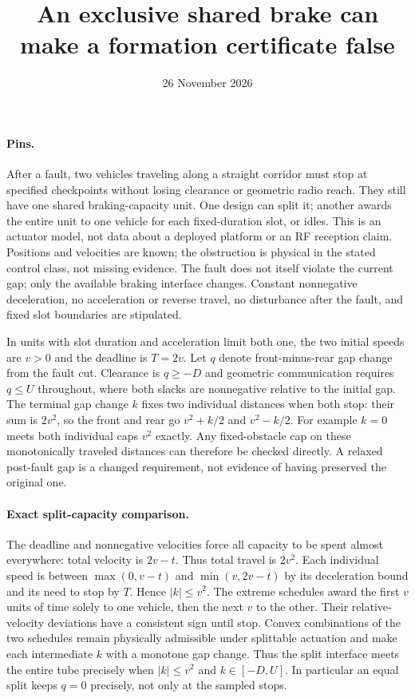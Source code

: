 \documentclass{article}
\title{An exclusive shared brake can make a formation certificate false}
\author{}
\date{26 November 2026}
\begin{document}
\maketitle
\paragraph{Pins.}
After a fault, two vehicles traveling along a straight corridor must stop
at specified checkpoints without losing clearance or geometric radio reach.
They still have one shared braking-capacity unit. One design can split it;
another awards the entire unit to one vehicle for each fixed-duration
slot, or idles. This is an actuator model, not data about a deployed
platform or an RF reception claim. Positions and velocities are known;
the obstruction is physical in the stated control class, not missing
evidence. The fault does not itself violate the current gap; only the
available braking interface changes. Constant nonnegative deceleration,
no acceleration or reverse travel, no disturbance after the fault, and
fixed slot boundaries are stipulated.

In units with slot duration and acceleration limit both one, the two
initial speeds are $v>0$ and the deadline is $T=2v$. Let $q$ denote
front-minus-rear gap change from the fault cut. Clearance is $q\ge-D$
and geometric communication requires $q\le U$ throughout, where
both slacks are nonnegative relative to the initial gap. The terminal
gap change $k$ fixes two individual distances when both stop:
their sum is $2v^2$, so the front and rear go $v^2+k/2$ and $v^2-k/2$.
For example $k=0$ meets both individual caps $v^2$ exactly. Any
fixed-obstacle cap on these monotonically traveled distances can
therefore be checked directly. A relaxed post-fault gap is a changed
requirement, not evidence of having preserved the original one.

\paragraph{Exact split-capacity comparison.}
The deadline and nonnegative velocities force all capacity to be spent
almost everywhere: total velocity is $2v-t$. Thus total travel is
$2v^2$. Each individual speed is between $\max(0,v-t)$ and
$\min(v,2v-t)$ by its deceleration bound and its need to stop by $T$.
Hence $|k|\le v^2$. The extreme schedules award the first $v$ units
of time solely to one vehicle, then the next $v$ to the other. Their
relative-velocity deviations have a consistent sign until stop.
Convex combinations of the two schedules remain physically admissible
under splittable actuation and make each intermediate $k$ with a monotone
gap change. Thus the split interface meets the entire tube precisely
when $|k|\le v^2$ and $k\in[-D,U]$. In particular an equal split
keeps $q=0$ precisely, not only at the sampled stops.
\end{document}
